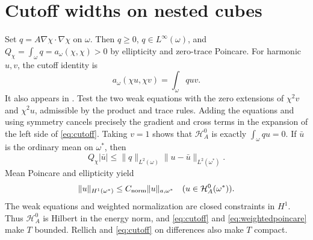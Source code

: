 \documentclass[11pt]{article}
\theoremstyle{remark}
\newcommand{\Ha}{\mathcal H_A}
\newcommand{\norma}[2]{\|#1\|_{a,#2}}
\begin{document}
\section{Cutoff widths on nested cubes}\label{sec:cubes}
Set $q=A\nabla\chi\cdot\nabla\chi$ on $\omega$.
Then $q\ge0$, $q\in L^\infty(\omega)$, and
$Q_\chi=\int_\omega q=a_\omega(\chi,\chi)>0$ by ellipticity and
zero-trace Poincare. For harmonic $u,v$, the cutoff identity is
\begin{equation}\label{eq:cutoff}
 a_\omega(\chi u,\chi v)=\int_\omega q uv.
\end{equation}
It also appears in \cite[Lemma 3.1]{MSD2021}.
Test the two weak equations with the zero extensions of $\chi^2v$
and $\chi^2u$, admissible by the product and trace rules. Adding
the equations and using symmetry cancels precisely the gradient
and cross terms in the expansion of the left side of \eqref{eq:cutoff}.
Taking $v=1$ shows that $\Ha^0$ is exactly $\int_\omega qu=0$.
If $\bar u$ is the ordinary mean on $\omega^*$, then
\[
 Q_\chi|\bar u|\le\|q\|_{L^2(\omega)}\|u-\bar u\|_{L^2(\omega^*)}.
\]
Mean Poincare and ellipticity yield
\begin{equation}\label{eq:weightedpoincare}
 \|u\|_{H^1(\omega^*)}\le C_{\rm norm}\norma{u}{\omega^*}
       \quad(u\in\Ha^0(\omega^*)).
\end{equation}
The weak equations and weighted normalization are closed constraints in
$H^1$. Thus $\Ha^0$ is Hilbert in the energy norm, and
\eqref{eq:cutoff} and \eqref{eq:weightedpoincare} make $T$ bounded.
Rellich and \eqref{eq:cutoff} on differences also make $T$ compact.
\end{document}
